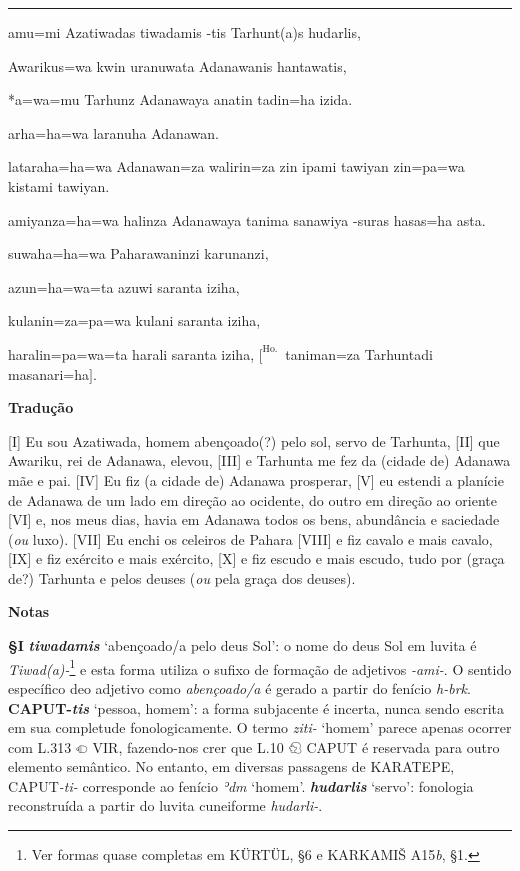 \vspace{10pt}
\hrule
\vspace{10pt}


\setcounter{parcount}{0}
\begin{parnumbersr}

	\raggedright%
	\itshape%

	amu=mi Azatiwadas tiwadamis -tis Tarhunt{(a)}s hudarlis,

	Awarikus=wa \lbreak{} kwin uranuwata Adanawanis hantawatis,

	*a=wa=mu Tarhunz Adanawaya anatin tadin=ha izida.

	arha=ha=wa laranuha Adanawan.

	lataraha=ha=wa Adanawan=za walirin=za zin ipami tawiyan zin=pa=wa kistami
	tawiyan.

	amiyanza=ha=wa halinza Adanawaya tanima sanawiya -suras
	hasas=ha asta.

	suwaha=ha=wa Paharawaninzi karunanzi,

	azun=ha=wa=ta azuwi saranta iziha,

	kulanin=za=pa=wa kulani saranta iziha,

	haralin=pa=wa=ta harali saranta iziha, $[^\text{Ho.}$\ taniman=za Tarhuntadi masanari=ha$]$.


\end{parnumbersr}


\clearpage%
\noindent\textbf{Tradução}

[I] Eu sou Azatiwada, homem abençoado{(?)} pelo sol, servo de Tarhunta, [II] que
Awariku, rei de Adanawa, elevou, [III] e Tarhunta me fez da (cidade de)
Adanawa mãe e pai. [IV] Eu fiz (a cidade de) Adanawa prosperar, [V] eu estendi
a planície de Adanawa de um lado em direção ao ocidente, do outro em direção
ao oriente [VI] e, nos meus dias, havia em Adanawa todos os bens, abundância e
saciedade (\emph{ou} luxo). [VII] Eu enchi os celeiros de Pahara [VIII] e fiz
cavalo e mais cavalo, [IX] e fiz exército e mais exército, [X] e fiz escudo e
mais escudo, tudo por {(graça de?)} Tarhunta e pelos deuses (\emph{ou} pela
graça dos deuses).

\bigskip
\noindent\textbf{Notas}

\smallskip
\noindent\textbf{§I}\tabto{2em}
\textbf{\emph{tiwadamis}} `abençoado/a pelo deus Sol': o nome do deus Sol em
luvita é \emph{Tiwad{(a)}-}\footnote{Ver formas quase completas em KÜRTÜL, §6 e
	KARKAMIŠ A15\emph{b}, §1.} e esta forma utiliza o sufixo de formação de
adjetivos \emph{-ami-}.
O sentido específico deo adjetivo como \emph{abençoado/a} é gerado a partir do
fenício \emph{h-brk}.
\textbf{CAPUT-\emph{tis}} `pessoa, homem': a forma subjacente é incerta, nunca
sendo escrita em sua completude fonologicamente.
O termo \emph{ziti-} `homem' parece apenas ocorrer com L.313 𔕠 VIR, fazendo-nos
crer que L.10 𔐉 CAPUT é reservada para outro elemento semântico.
No entanto, em diversas passagens de KARATEPE, CAPUT\emph{-ti-} corresponde ao
fenício \emph{ʾdm} `homem'.
\textbf{\emph{hudarlis}} `servo': fonologia reconstruída a partir do
luvita cuneiforme \emph{hudarli-}.

